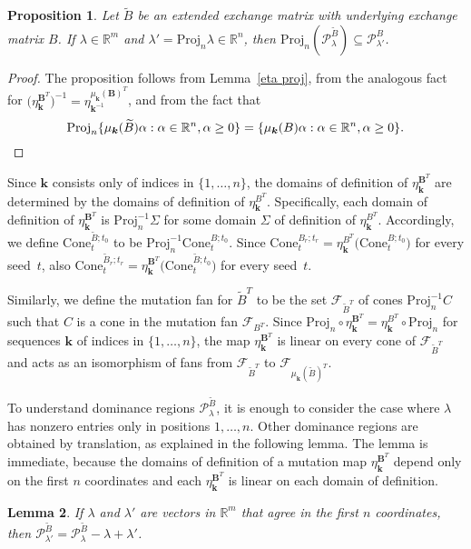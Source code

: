 \documentclass{amsart}
\newtheorem{proposition}{Proposition}[section]
\newtheorem{lemma}[proposition]{Lemma}
\theoremstyle{definition}
\theoremstyle{remark}
\numberwithin{equation}{section}
\newcommand{\reals}{\mathbb R}
\newcommand{\set}[1]{{\lbrace #1 \rbrace}}
\newcommand{\GG}{{\mathbf G}}
\newcommand{\F}{{\mathcal F}}
\newcommand{\0}{{\mathbf{0}}}
\newcommand{\Cone}{\mathrm{Cone}}
\newcommand{\Proj}{\mathrm{Proj}}
\newcommand{\kk}{{\boldsymbol{k}}}
\newcommand{\tB}{{\widetilde{B}}}
\newcommand{\BB}{\mathbf{B}}
\renewcommand{\P}{\mathcal{P}}
\begin{document}
\begin{proposition}\label{contains proj}
Let $\tB$ be an extended exchange matrix with underlying exchange matrix $B$.
If $\lambda\in\reals^m$ and $\lambda'=\Proj_n\lambda\in\reals^n$, then $\Proj_n(\P_\lambda^\tB)\subseteq\P_{\lambda'}^B$.
\end{proposition}
\begin{proof}
The proposition follows from Lemma~\ref{eta proj}, from the analogous fact for $\bigl(\eta_\kk^{\BB^T}\bigr)^{-1}=\eta_{\kk^{-1}}^{\mu_\kk(\BB)^T}$, and from the fact that 
\[\Proj_n\set{\mu_\kk(\tB)\alpha:\alpha\in\reals^n,\alpha\ge0}=\set{\mu_\kk(B)\alpha:\alpha\in\reals^n,\alpha\ge0}.\qedhere\]
\end{proof}

Since $\kk$ consists only of indices in $\set{1,\ldots,n}$, the domains of definition of $\eta_\kk^{\BB^T}$ are determined by the domains of definition of $\eta_\kk^{B^T}$.
Specifically, each domain of definition of $\eta_\kk^{\BB^T}$ is $\Proj_n^{-1}\Sigma$ for some domain $\Sigma$ of definition of $\eta_\kk^{B^T}$.
Accordingly, we define $\Cone_t^{\tB;t_0}$ to be %
$\Proj_n^{-1}\Cone_t^{B;t_0}$.
Since $\Cone_t^{B_r;t_r}=\eta_\kk^{B^T}\bigl(\Cone_t^{B;t_0}\bigr)$ for every seed~$t$, also $\Cone_t^{\tB_r;t_r}=\eta_\kk^{\BB^T}\bigl(\Cone_t^{\tB;t_0}\bigr)$ for every seed~$t$.

Similarly, we define the mutation fan for $\tB^T$ to be the set $\F_{\tB^T}$ of cones $\Proj_n^{-1}C$ such that $C$ is a cone in the mutation fan $\F_{B^T}$.
Since $\Proj_n\circ\eta_\kk^{\BB^T}=\eta_\kk^{B^T}\circ\Proj_n$ for sequences $\kk$ of indices in $\set{1,\ldots,n}$, the map $\eta_\kk^{\BB^T}$ is linear on every cone of $\F_{\tB^T}$ and acts as an isomorphism of fans from $\F_{\tB^T}$ to $\F_{\mu_\kk(\tB)^T}$.

To understand dominance regions $\P^\tB_\lambda$, it is enough to consider the case where $\lambda$ has nonzero entries only in positions $1,\ldots,n$.
Other dominance regions are obtained by translation, as explained in the following lemma.
The lemma is immediate, because the domains of definition of a mutation map $\eta_\kk^{\BB^T}$ depend only on the first $n$ coordinates and each $\eta_\kk^{\BB^T}$ is linear on each domain of definition.
\begin{lemma}\label{after all coefficients are just coefficients}
If $\lambda$ and $\lambda'$ are vectors in $\reals^m$ that agree in the first $n$ coordinates, then $\P^\tB_{\lambda'}=\P^\tB_\lambda-\lambda+\lambda'$.
\end{lemma}
\end{document}
